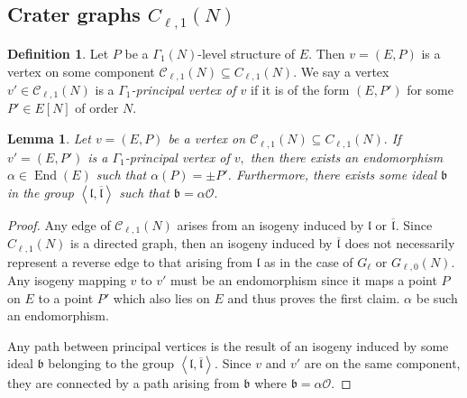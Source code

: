 \documentclass[11pt,a4paper]{amsart}
\theoremstyle{plain}
\newtheorem{lem}[thm]{Lemma}
\theoremstyle{definition}
\newtheorem{defn}[thm]{Definition}
\theoremstyle{remark}
\DeclareMathOperator{\Endo}{End}
\begin{document}
\subsection{Crater graphs $C_{\ell,1}(N)$}
\begin{defn}\label{defn:principal-vertex-1}
  Let $P$ be a $\Gamma_1(N)$-level structure of $E.$ Then $v = (E, P)$ is a vertex on some component $\mathcal{C}_{\ell,1}(N) \subseteq C_{\ell,1}(N).$ We say a vertex $v' \in \mathcal{C}_{\ell,1}(N)$ is a \emph{$\Gamma_1$-principal vertex of $v$} if it is of the form $(E, P')$ for some $P' \in E[N]$ of order $N.$
\end{defn}
\begin{lem}\label{lem:principal-vertex-1}
Let $v = (E,P)$ be a vertex on $\mathcal{C}_{\ell,1}(N) \subseteq C_{\ell,1}(N).$ If $v' = (E, P')$ is a $\Gamma_1$-principal vertex of $v,$ then there exists an endomorphism $\alpha \in \Endo(E)$ such that $\alpha(P) = \pm P'$. Furthermore, there exists some ideal $\mathfrak{b}$ in the group $\left\langle \mathfrak{l}, \overline{\mathfrak{l}} \right\rangle$ such that $\mathfrak{b} = \alpha\mathcal{O}.$
\end{lem}
\begin{proof}
  Any edge of $\mathcal{C}_{\ell,1}(N)$ arises from an isogeny induced by $\mathfrak{l}$ or $\overline{\mathfrak{l}}.$ Since $C_{\ell,1}(N)$ is a directed graph, then an isogeny induced by $\overline{\mathfrak{l}}$ does not necessarily represent a reverse edge to that arising from $\mathfrak{l}$ as in the case of $G_{\ell}$ or $G_{\ell,0}(N).$ Any isogeny mapping $v$ to $v'$ must be an endomorphism since it maps a point $P$ on $E$ to a point $P'$ which also lies on $E$ and thus proves the first claim. $\alpha$ be such an endomorphism.

  Any path between principal vertices is the result of an isogeny induced by some ideal $\mathfrak{b}$ belonging to the group $\left\langle \mathfrak{l}, \overline{\mathfrak{l}}  \right\rangle$. Since $v$ and $v'$ are on the same component, they are connected by a path arising from $\mathfrak{b}$ where $\mathfrak{b} = \alpha \mathcal{O}.$
\end{proof}
\end{document}
